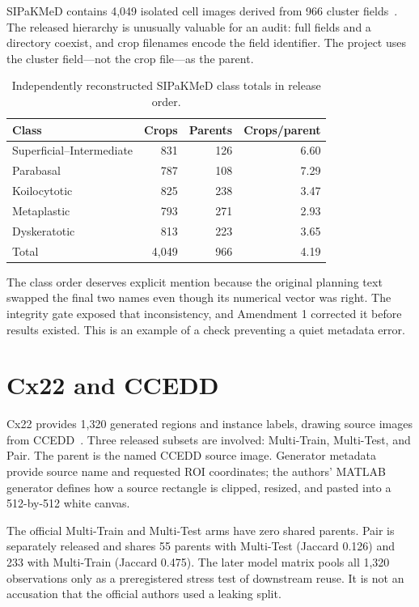 SIPaKMeD contains 4,049 isolated cell images derived from 966 cluster fields~\cite{plissiti2018sipakmed}. The released hierarchy is unusually valuable for an audit: full fields and a  directory coexist, and crop filenames encode the field identifier. The project uses the cluster field---not the crop file---as the parent.

\begin{table}[H]
\centering
\caption{Independently reconstructed SIPaKMeD class totals in release order.}
\label{s1:tab:sip-classes}
\begin{tabular}{lrrr}
\toprule
Class & Crops & Parents & Crops/parent \\
\midrule
Superficial--Intermediate & 831 & 126 & 6.60 \\
Parabasal & 787 & 108 & 7.29 \\
Koilocytotic & 825 & 238 & 3.47 \\
Metaplastic & 793 & 271 & 2.93 \\
Dyskeratotic & 813 & 223 & 3.65 \\
\midrule
Total & 4,049 & 966 & 4.19 \\
\bottomrule
\end{tabular}
\end{table}

The class order deserves explicit mention because the original planning text swapped the final two names even though its numerical vector was right. The integrity gate exposed that inconsistency, and Amendment 1 corrected it before results existed. This is an example of a check preventing a quiet metadata error.

\section{Cx22 and CCEDD}

Cx22 provides 1,320 generated regions and instance labels, drawing source images from CCEDD~\cite{liu2022cx22}. Three released subsets are involved: Multi-Train, Multi-Test, and Pair. The parent is the named CCEDD source image. Generator metadata provide source name and requested ROI coordinates; the authors' MATLAB generator defines how a source rectangle is clipped, resized, and pasted into a 512-by-512 white canvas.

The official Multi-Train and Multi-Test arms have zero shared parents. Pair is separately released and shares 55 parents with Multi-Test (Jaccard 0.126) and 233 with Multi-Train (Jaccard 0.475). The later model matrix pools all 1,320 observations only as a preregistered stress test of downstream reuse. It is not an accusation that the official authors used a leaking split.

